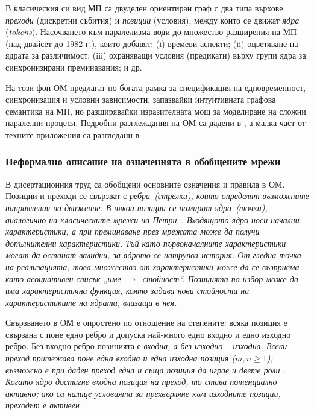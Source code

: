 В класическия си вид МП са двуделен ориентиран граф с два типа върхове: \emph{преходи} (дискретни събития) и \emph{позиции} (условия), между които се движат \emph{ядра} (\textit{tokens}). Насочването към паралелизма води до множество разширения на МП (над двайсет до 1982 г.), които добавят: (i) времеви аспекти; (ii) оцветяване на ядрата за различимост; (iii) охраняващи условия (предикати) върху групи ядра за синхронизирани преминавания; и др.

На този фон ОМ предлагат по-богата рамка за спецификация на едновременност, синхронизация и условни зависимости, запазвайки интуитивната графова семантика на МП, но разширявайки изразителната мощ за моделиране на сложни паралелни процеси. Подробни разглеждания на ОМ са дадени в \cite{DIS-Z3,DIS-Z1,DIS-BAM, DIS-AtanassovSotirova2017}, а малка част от техните приложения са разгледани в \cite{DIS-Orozova2011,DIS-Georgiev1998,DIS-StefanovaPavlova2001,DIS-Aladjov2002}.

\subsubsection{Неформално описание на означенията в обобщените мрежи}

\hspace*{2.5em}В дисертационния труд са обобщени основните означения и правила в ОМ. Позиции и преходи се свързват с \it ребра\rm\ (стрелки), които определят възможните направления на движение. В някои позиции се намират \it ядра\rm\ (точки), аналогично на класическите мрежи на Петри~\cite{DIS-Q148}. Входящото ядро носи \textit{начални характеристики}, а при преминаване през мрежата може да получи допълнителни характеристики. Тъй като първоначалните характеристики могат да останат валидни, за ядрото се натрупва \textit{история}. От гледна точка на реализацията, това множество от характеристики може да се възприема като асоциативен списък „име~$\to$~стойност“. Позицията по избор може да има \it характеристична функция\rm, която задава нови стойности на характеристиките на ядрата, влизащи в нея.

Свързването в ОМ е опростено по отношение на степените: всяка позиция е свързана с поне едно ребро и допуска най-много едно входно и едно изходно ребро. Без входно ребро позицията е \it входна\rm, а без изходно -- \it изходна\rm. Всеки преход притежава поне една входна и една изходна позиция ($m,n\ge1$); възможно е при даден преход една и съща позиция да играе и двете роли \cite{DIS-Z1}. Когато ядро достигне входна позиция на преход, то става \em потенциално активно\rm; ако са налице условията за прехвърляне към изходните позиции, преходът е \it активен\rm.

